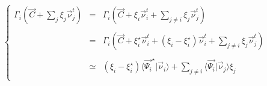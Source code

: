 \documentclass[aps,12pt]{revtex4}
\begin{document}
\begin{equation}
\left\lbrace
\begin{array}{rcl}
\Gamma_i\left(\vec{C} + \sum_j \xi_j \vec{\nu}^t_j\right) & = &  \displaystyle \Gamma_i\left(\vec{C} + \xi_i \vec{\nu}_i^t + \sum_{j\not=i} \xi_j \vec{\nu}^t_j\right)\\
\\
& = & \displaystyle\Gamma_i\left(\vec{C} + \xi_i^\star \vec{\nu}_i^t + (\xi_i-\xi_i^\star) \vec{\nu}_i^t + \sum_{j\not=i} \xi_j \vec{\nu}^t_j\right)\\
\\
& \simeq & \displaystyle (\xi_i-\xi_i^\star) \langle \vec{\Psi_i}^\star \vert \vec{\nu}_i \rangle  + \sum_{j\not=i} \langle \vec{\Psi_i} \vert \vec{\nu}_j  \rangle \xi_j\\
\end{array}
\right.
\end{equation}
\end{document}
